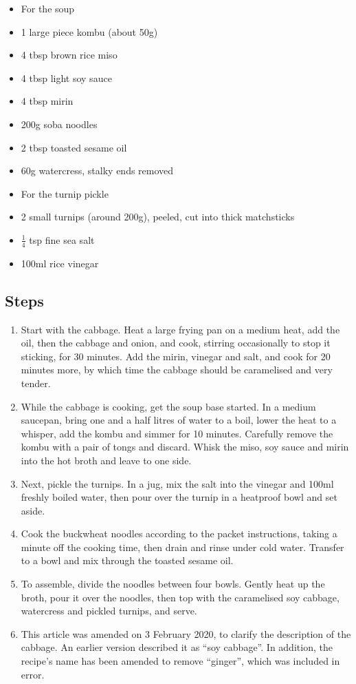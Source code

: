 \documentclass{book}
\begin{document}
\begin{itemize}
\item For the soup
\item 1 large piece kombu (about 50g)
\item 4 tbsp brown rice miso 
\item 4 tbsp light soy sauce
\item 4 tbsp mirin 
\item 200g soba noodles 
\item 2 tbsp toasted sesame oil 
\item 60g watercress, stalky ends removed
\end{itemize}

\begin{itemize}
\item For the turnip pickle
\item 2 small turnips (around 200g), peeled, cut into thick matchsticks 
\item $\frac{1}{4}$ tsp fine sea salt 
\item 100ml rice vinegar
\end{itemize}

\subsection*{Steps}
\begin{enumerate}
\item Start with the cabbage. Heat a large frying pan on a medium heat, add the oil, then the cabbage and onion, and cook, stirring occasionally to stop it sticking, for 30 minutes. Add the mirin, vinegar and salt, and cook for 20 minutes more, by which time the cabbage should be caramelised and very tender.
\item While the cabbage is cooking, get the soup base started. In a medium saucepan, bring one and a half litres of water to a boil, lower the heat to a whisper, add the kombu and simmer for 10 minutes. Carefully remove the kombu with a pair of tongs and discard. Whisk the miso, soy sauce and mirin into the hot broth and leave to one side.
\item Next, pickle the turnips. In a jug, mix the salt into the vinegar and 100ml freshly boiled water, then pour over the turnip in a heatproof bowl and set aside.
\item Cook the buckwheat noodles according to the packet instructions, taking a minute off the cooking time, then drain and rinse under cold water. Transfer to a bowl and mix through the toasted sesame oil.
\item To assemble, divide the noodles between four bowls. Gently heat up the broth, pour it over the noodles, then top with the caramelised soy cabbage, watercress and pickled turnips, and serve.
\item  This article was amended on 3 February 2020, to clarify the description of the cabbage. An earlier version described it as “soy cabbage”. In addition, the recipe’s name has been amended to remove “ginger”, which was included in error. 
\end{enumerate}
\newpage
\end{document}
